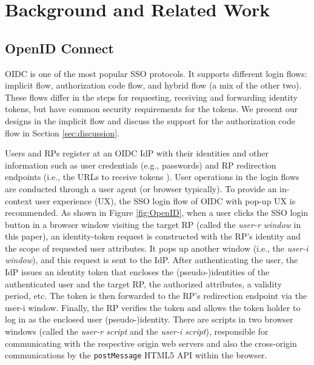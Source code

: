 \section{Background and Related Work}
\label{sec:background}

\subsection{OpenID Connect}
\label{subsec:OIDC}
OIDC is one of the most popular SSO protocols. It supports different login flows: implicit flow, authorization code flow, and hybrid flow (a mix of the other two).
These flows differ in the steps for requesting, receiving and forwarding identity tokens, but have common security requirements for the tokens.
We present our designs in the implicit flow and discuss the support for the authorization code flow in Section \ref{sec:discussion}.

Users and RPs register at an OIDC IdP with their identities
and other information such as user credentials (e.g., passwords)
and RP redirection endpoints (i.e., the URLs to receive tokens \cite{rfc6749}).
User operations in the login flows are conducted through a user agent (or browser typically).
To provide an in-context user experience (UX),
    the SSO login flow of OIDC with pop-up UX \cite{dimvaLiM16,GoogleIdIntegrate,uber} is recommended.
As shown in Figure \ref{fig:OpenID},
when a user clicks the SSO login button in a browser window visiting the target RP 
(called the \emph{user-r window} in this paper),
 an identity-token request is constructed with the RP's identity and the scope of requested user attributes.
It pops up another window (i.e., the \emph{user-i window}),
    and this request is sent to the IdP.
After authenticating the user, the IdP issues an identity token that encloses the (pseudo-)identities of the authenticated user and the target RP, the authorized attributes, a validity period, etc.
The token is then forwarded to the RP's redirection endpoint via the user-i window.
Finally, the RP verifies the token and allows the token holder to log in as the enclosed user (pseudo-)identity.
There are scripts in two browser windows (called the \emph{user-r script} and the \emph{user-i script}),
    responsible for communicating with the respective origin web servers
    and also the cross-origin
communications by the \verb+postMessage+ HTML5 API \cite{postm-targeto} within the browser.



